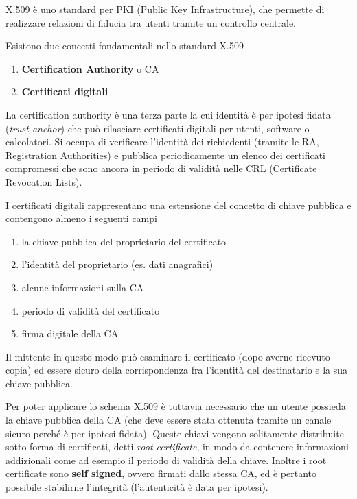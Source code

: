 \documentclass[italian,]{article}
\providecommand{\tightlist}{%
  \setlength{\itemsep}{0pt}\setlength{\parskip}{0pt}}
\begin{document}
X.509 è uno standard per PKI (Public Key Infrastructure), che permette
di realizzare relazioni di fiducia tra utenti tramite un controllo
centrale.

Esistono due concetti fondamentali nello standard X.509

\begin{enumerate}
\def\labelenumi{\arabic{enumi}.}
\tightlist
\item
  \textbf{Certification Authority} o CA
\item
  \textbf{Certificati digitali}
\end{enumerate}

La certification authority è una terza parte la cui identità è per
ipotesi fidata (\emph{trust anchor}) che può rilasciare certificati
digitali per utenti, software o calcolatori. Si occupa di verificare
l'identità dei richiedenti (tramite le RA, Registration Authorities) e
pubblica periodicamente un elenco dei certificati compromessi che sono
ancora in periodo di validità nelle CRL (Certificate Revocation Lists).

I certificati digitali rappresentano una estensione del concetto di
chiave pubblica e contengono almeno i seguenti campi

\begin{enumerate}
\def\labelenumi{\arabic{enumi}.}
\tightlist
\item
  la chiave pubblica del proprietario del certificato
\item
  l'identità del proprietario (es. dati anagrafici)
\item
  alcune informazioni sulla CA
\item
  periodo di validità del certificato
\item
  firma digitale della CA
\end{enumerate}

Il mittente in questo modo può esaminare il certificato (dopo averne
ricevuto copia) ed essere sicuro della corrispondenza fra l'identità del
destinatario e la sua chiave pubblica.

Per poter applicare lo schema X.509 è tuttavia necessario che un utente
possieda la chiave pubblica della CA (che deve essere stata ottenuta
tramite un canale sicuro perché è per ipotesi fidata). Queste chiavi
vengono solitamente distribuite sotto forma di certificati, detti
\emph{root certificate}, in modo da contenere informazioni addizionali
come ad esempio il periodo di validità della chiave. Inoltre i root
certificate sono \textbf{self signed}, ovvero firmati dallo stessa CA,
ed è pertanto possibile stabilirne l'integrità (l'autenticità è data per
ipotesi).
\end{document}
